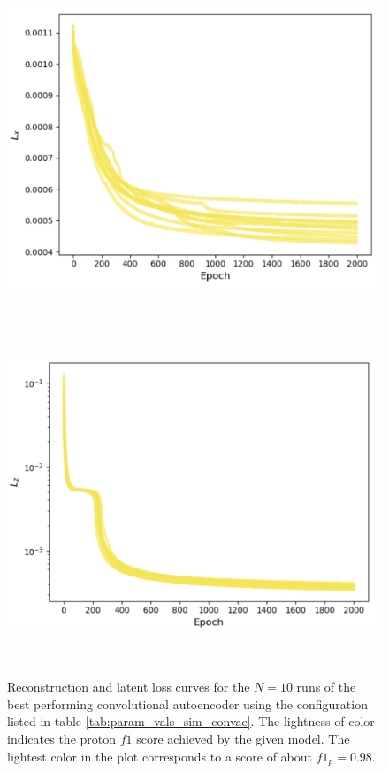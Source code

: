 \begin{figure}[H]
\centering
\includegraphics[width=\textwidth, height=4in]{plots/reconst_best_model_simulated.png}
\includegraphics[width=\textwidth, height=4in]{plots/latent_best_model_simulated.png}
\caption[$L_x$ and $L_z$ for the CONV-AE on simulated AT-TPC data]{Reconstruction and latent loss curves for the $N=10$ runs of the best performing convolutional autoencoder using the configuration listed in table \ref{tab:param_vals_sim_convae}. The lightness of color indicates the proton $f1$ score achieved by the given model. The lightest color in the plot corresponds to a score of about $f1_p = 0.98$.}\label{fig:best_model_sim_clf}
\end{figure}

